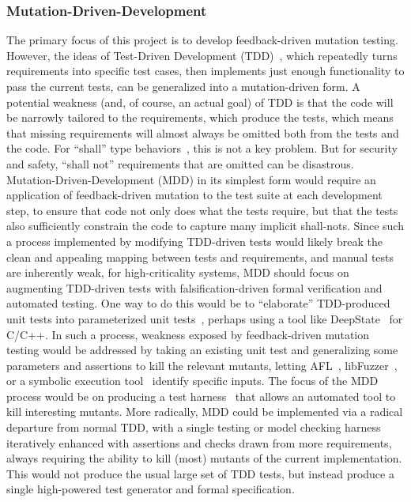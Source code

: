 \subsubsection{Mutation-Driven-Development}

The primary focus of this project is to develop feedback-driven mutation testing.  However, the ideas of Test-Driven Development (TDD)~\cite{TDD,TDDFuture}, which repeatedly turns requirements into specific test cases, then implements just enough functionality to pass the current tests, can be generalized into a mutation-driven form.  A potential weakness (and, of course, an actual goal) of TDD is that the code will be narrowly tailored to the requirements, which produce the tests, which means that missing requirements will almost always be omitted both from the tests and the code.  For ``shall'' type behaviors~\cite{INCOSE}, this is not a key problem.  But for security and safety, ``shall not'' requirements that are omitted can be disastrous.  Mutation-Driven-Development (MDD) in its simplest form would require an application of feedback-driven mutation to the test suite at each development step, to ensure that code not only does what the tests require, but that the tests also sufficiently constrain the code to capture many implicit shall-nots.  Since such a process implemented by modifying TDD-driven tests would likely break the clean and appealing mapping between tests and requirements, and manual tests are inherently weak, for high-criticality systems, MDD should focus on augmenting TDD-driven tests with falsification-driven formal verification and automated testing.  One way to do this would be to ``elaborate'' TDD-produced unit tests into parameterized unit tests~\cite{UnitMeister,ParamUnit}, perhaps using a tool like DeepState~\cite{DeepState} for C/C++.  In such a process, weakness exposed by feedback-driven mutation testing would be addressed by taking an existing unit test and generalizing some parameters and assertions to kill the relevant mutants, letting AFL~\cite{aflfuzz}, libFuzzer~\cite{libfuzzer}, or a symbolic execution tool~\cite{angr1,angr2,manticore} identify specific inputs.  The focus of the MDD process would be on producing a test harness~\cite{WODACommon,tstlsttt} that allows an automated tool to kill interesting mutants.  More radically, MDD could be implemented via a radical departure from normal TDD, with a single testing or model checking harness iteratively enhanced with assertions and checks drawn from more requirements, always requiring the ability to kill (most) mutants of the current implementation.  This would not produce the usual large set of TDD tests, but instead produce a single high-powered test generator and formal specification.


